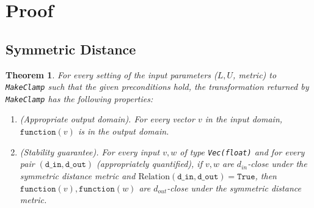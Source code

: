 \documentclass[11pt,a4paper]{article}
\newtheorem{theorem}{Theorem}
\theoremstyle{definition}
\newcommand{\din}{\texttt{d\_in}}
\newcommand{\dout}{\texttt{d\_out}}
\newcommand{\Relation}{\mathrm{Relation}}
\newcommand{\True}{\texttt{True}}
\newcommand{\function}{\texttt{function}}
\newcommand{\silvia}[1]{{ {\color{blue}{(silvia)~#1}}}}
\newcommand{\todo}{{\textcolor{red}{TODO }}}
\begin{document}
\section{Proof}
\subsection{Symmetric Distance}



\begin{theorem}
    For every setting of the input parameters ($L, U$, metric) to \texttt{MakeClamp} such that the given preconditions
    hold, the transformation returned by \texttt{MakeClamp} has the following properties:
    \begin{enumerate}
        \item \textup{(Appropriate output domain).} For every vector $v$ in the input domain, $\function(v)$ is in the output domain. %
        \item \textup{(Stability guarantee).} For every input $v,w$ of type \texttt{Vec(float)} and for every pair $(\din, \dout)$ (appropriately quantified), if $v,w$ are $d_{in}$-close under the symmetric distance metric and $\Relation(\din, \dout) = \True$, then $\function(v), \function(w)$ are $d_{out}$-close under the symmetric distance metric.
    \end{enumerate}
\end{theorem}
\end{document}
